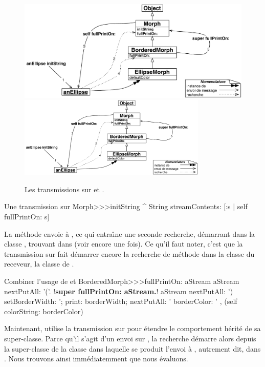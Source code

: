\documentclass[a4paper,10pt,twoside]{book}
\begin{document}
\begin{figure}[htb]
\begin{center}
\ifluluelse
	{\includegraphics[width=\textwidth]{initStringLookup}}
	{\includegraphics[width=0.8\textwidth]{initStringLookup}}
\caption{Les transmissions sur \self et \super.\label{fig:initStringLookup}}
\end{center}
\end{figure}

\begin{method}[initString]{Une transmission sur \self}
Morph>>>initString
	^ String streamContents: [:s | self fullPrintOn: s]
\end{method}
La m\'ethode  envoie  \`a \self,
ce qui entra\^{\i}ne une seconde recherche, d\'emarrant dans la classe
, trouvant  dans  (voir  encore une fois).
Ce qu'il faut noter, c'est que la transmission sur \self
fait d\'emarrer encore la recherche de m\'ethode dans la classe du 
receveur, \ie la classe de
.


\begin{method}[fullPrintOn]{Combiner l'usage de \super et \self}
BorderedMorph>>>fullPrintOn: aStream
	aStream nextPutAll: '('.
	!\textbf{super fullPrintOn: aStream.}!
	aStream nextPutAll: ') setBorderWidth: '; print: borderWidth;
		nextPutAll: ' borderColor: ' , (self colorString: borderColor)
\end{method}
Maintenant,  utilise la transmission sur \super pour \'etendre le comportement  h\'erit\'e de sa super-classe.
Parce qu'il s'agit d'un envoi sur \super, la recherche d\'emarre alors
depuis la super-classe de la classe dans laquelle se produit l'envoi \`a
\super, autrement dit, dans 
.
Nous trouvons ainsi imm\'ediatemment  que nous \'evaluons.
\end{document}
